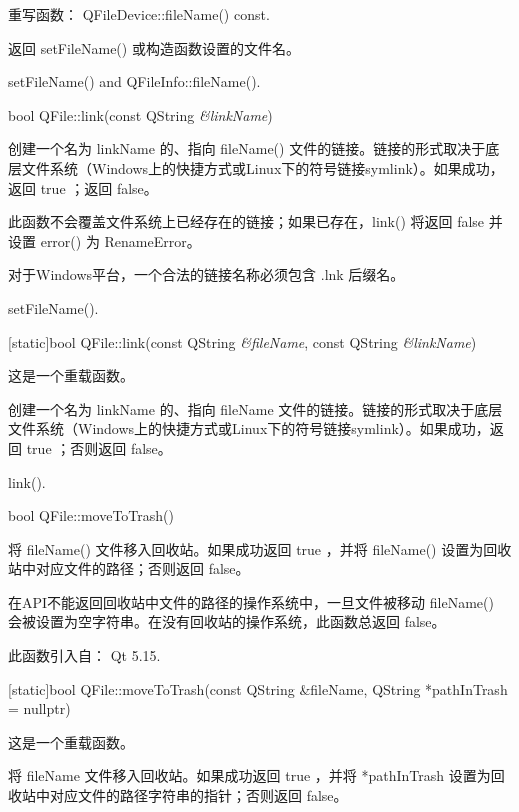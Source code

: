 重写函数： QFileDevice::fileName() const.

返回 setFileName() 或构造函数设置的文件名。


\begin{notice}[另请参阅]
setFileName() and QFileInfo::fileName().
\end{notice} 

bool QFile::link(const QString \emph{\&linkName})

创建一个名为 linkName 的、指向 fileName() 文件的链接。链接的形式取决于底层文件系统（Windows上的快捷方式或Linux下的符号链接symlink）。如果成功，返回 true ；返回 false。

此函数不会覆盖文件系统上已经存在的链接；如果已存在，link() 将返回 false 并设置 error() 为 RenameError。


\begin{notice}
对于Windows平台，一个合法的链接名称必须包含 .lnk 后缀名。
\end{notice} 


\begin{notice}[另请参阅]
setFileName().
\end{notice} 

[static]bool QFile::link(const QString \emph{\&fileName}, const QString \emph{\&linkName})

这是一个重载函数。

创建一个名为 linkName 的、指向 fileName 文件的链接。链接的形式取决于底层文件系统（Windows上的快捷方式或Linux下的符号链接symlink）。如果成功，返回 true ；否则返回 false。



\begin{notice}[另请参阅]
link().
\end{notice} 

bool QFile::moveToTrash()

将 fileName() 文件移入回收站。如果成功返回 true ，并将 fileName() 设置为回收站中对应文件的路径；否则返回 false。
 

\begin{notice}
在API不能返回回收站中文件的路径的操作系统中，一旦文件被移动 fileName() 会被设置为空字符串。在没有回收站的操作系统，此函数总返回 false。
\end{notice} 

此函数引入自： Qt 5.15.

[static]bool QFile::moveToTrash(const QString \&fileName, QString *pathInTrash = nullptr)

这是一个重载函数。

将 fileName 文件移入回收站。如果成功返回 true ，并将 *pathInTrash 设置为回收站中对应文件的路径字符串的指针；否则返回 false。

